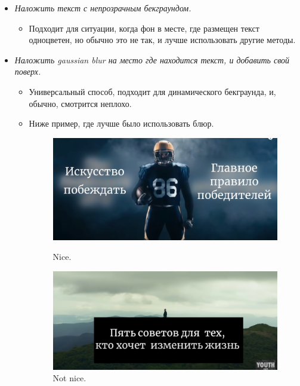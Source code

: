 \documentclass[
a4paper, %
12pt, %
article,
onecolumn, %
openany, %
]{memoir}
\begin{document}
\begin{itemize}
  \item \emph{Наложить текст с непрозрачным бекграундом.}

        \begin{itemize}
          \item Подходит для ситуации, когда фон в месте, где размещен текст
                одноцветен, но обычно это не так, и лучше использовать другие методы.
        \end{itemize}

  \item \emph{Наложить gaussian blur на место где находится текст, и добавить
          свой поверх.}

        \begin{itemize}
          \item Универсальный способ, подходит для
                динамического бекграунда, и, обычно, смотрится неплохо.

          \item Ниже пример, где лучше было использовать блюр.

                \begin{figure}[!hbp]
                  \centering
                  \begin{minipage}[b]{0.4\textwidth}
                    \includegraphics[width=\textwidth]{titleBlur}
                    \caption{Nice.}
                  \end{minipage}
                  \hfill
                  \begin{minipage}[b]{0.4\textwidth}
                    \includegraphics[width=\textwidth]{titleBlurBad}
                    \caption{Not nice.}
                  \end{minipage}
                \end{figure}


\end{itemize}
\end{itemize}
\end{document}
